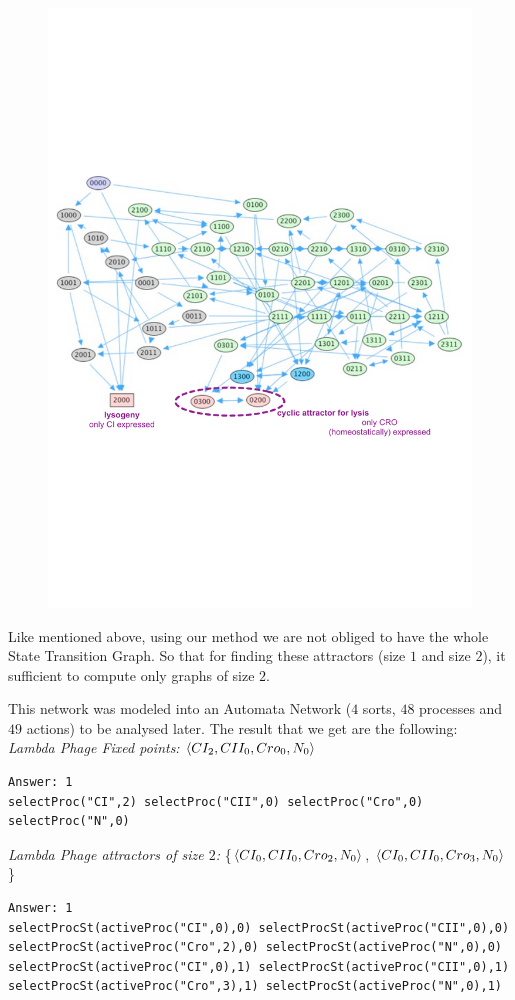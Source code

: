 \begin{figure}[h]
   \includegraphics{figures/lampdaphage-STG.pdf}
\end{figure}

Like mentioned above, using our method we are not obliged to have the whole State Transition Graph. So that for finding these attractors (size $1$ and size $2$), it sufficient to compute only graphs of size $2$.

This network was modeled into an Automata Network ($4$ sorts, $48$ processes and $49$ actions) to be analysed later. The result that we get are the following: \\
\textit{ Lambda Phage Fixed points:} $\mbox{$\langle CI_2, CII_0, Cro_0, N_0 \rangle$}$
\begin{lstlisting}[numbers=none]
Answer: 1
selectProc("CI",2) selectProc("CII",0) selectProc("Cro",0) selectProc("N",0)
\end{lstlisting}
\textit{Lambda Phage attractors of size $2$:} \{$\mbox{$\langle CI_0, CII_0, Cro_2, N_0 \rangle$}$, $\mbox{$\langle CI_0, CII_0, Cro_3, N_0 \rangle$}$ \}
\begin{lstlisting}[numbers=none]
Answer: 1
selectProcSt(activeProc("CI",0),0) selectProcSt(activeProc("CII",0),0)
selectProcSt(activeProc("Cro",2),0) selectProcSt(activeProc("N",0),0) 
selectProcSt(activeProc("CI",0),1) selectProcSt(activeProc("CII",0),1)
selectProcSt(activeProc("Cro",3),1) selectProcSt(activeProc("N",0),1)
 \end{lstlisting}

